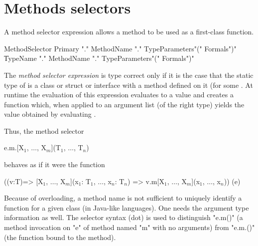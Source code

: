 
\section{Methods selectors}
\label{MethodSelectors}

A method selector expression allows a method to be used as a
first-class function.

\begin{grammar}
MethodSelector \:
        Primary \xcd"."
        MethodName \xcd"."
                TypeParameters\opt \xcd"(" Formals\opt \xcd")" \\
      \|
        TypeName \xcd"."
        MethodName \xcd"."
                TypeParameters\opt \xcd"(" Formals\opt \xcd")" \\
\end{grammar}

The \emph{method selector expression}  is type
correct only if it is the case that the static type of  is a
class or struct or interface with a method
 defined on it (for some
. At runtime the evaluation of this expression
evaluates  to a value  and creates a function 
which, when applied to an argument list  (of the right
type) yields the value obtained by evaluating .

Thus, the method selector

\begin{xtenmath}
e.m.[X$_1$, $\dots$, X$_m$](T$_1$, $\dots$, T$_n$)
\end{xtenmath}
\noindent behaves as if it were the function
\begin{xtenmath}
((v:T)=>
  [X$_1$, $\dots$, X$_m$](x$_1$: T$_1$, $\dots$, x$_n$: T$_n$) => v.m[X$_1$, $\dots$, X$_m$](x$_1$, $\dots$, x$_n$))
(e)
\end{xtenmath}

\begin{note}
Because of overloading, a method name is not sufficient to
uniquely identify a function for a given class (in Java-like languages).
One needs the argument type information as well.
The selector syntax (dot) is used to distinguish \xcd"e.m()" (a
method invocation on \xcd"e" of method named \xcd"m" with no arguments)
from \xcd"e.m.()"
(the function bound to the method). 
\end{note}

